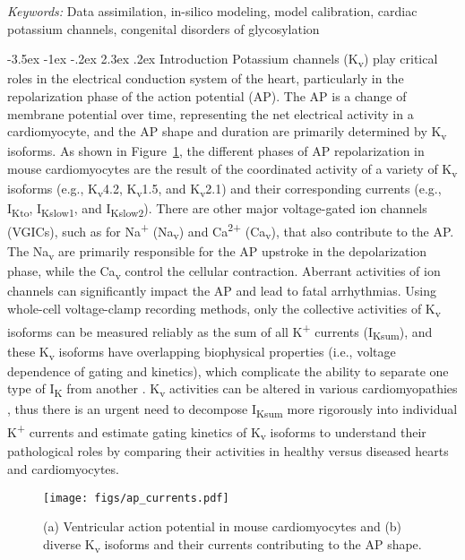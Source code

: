 \documentclass[11pt]{article}
\makeatletter
\renewcommand\section{\@startsection {section}{1}{\z@}%
                                   {-3.5ex \@plus -1ex \@minus -.2ex}%
                                   {2.3ex \@plus.2ex}%
                                   {\normalfont\fontfamily{phv}\fontsize{16}{19}\bfseries}}
\makeatother
\begin{document}
\noindent%
{\it Keywords:} Data assimilation, in-silico modeling, model calibration, cardiac potassium channels, congenital disorders of glycosylation

{} %

\section{Introduction}
Potassium channels (K\textsubscript{v}) play critical roles in the electrical conduction system of the heart, particularly in the repolarization phase of the action potential (AP). The AP is a change of membrane potential over time, representing the net electrical activity in a cardiomyocyte, and the AP shape and duration are primarily determined by K\textsubscript{v} isoforms. As shown in Figure~\ref{fig:ap_currents}, the different phases of AP repolarization in mouse cardiomyocytes are the result of the coordinated activity of a variety of K\textsubscript{v} isoforms (e.g., K\textsubscript{v}4.2, K\textsubscript{v}1.5, and K\textsubscript{v}2.1) and their corresponding currents (e.g., I\textsubscript{Kto}, I\textsubscript{Kslow1}, and I\textsubscript{Kslow2}). There are other major voltage-gated ion channels (VGICs), such as for Na\textsuperscript{+} (Na\textsubscript{v}) and Ca\textsuperscript{2+} (Ca\textsubscript{v}), that also contribute to the AP. The Na\textsubscript{v} are primarily responsible for the AP upstroke in the depolarization phase, while the Ca\textsubscript{v} control the cellular contraction. Aberrant activities of ion channels can significantly impact the AP and lead to fatal arrhythmias. Using whole-cell voltage-clamp recording methods, only the collective activities of K\textsubscript{v} isoforms can be measured reliably as the sum of all K\textsuperscript{+} currents (I\textsubscript{Ksum}), and these K\textsubscript{v} isoforms have overlapping biophysical properties (i.e., voltage dependence of gating and kinetics), which complicate the ability to separate one type of I\textsubscript{K} from another \citep{brouillette2004functional}. K\textsubscript{v} activities can be altered in various cardiomyopathies \citep{tristani2001molecular,giudicessi2012potassium}, thus there is an urgent need to decompose I\textsubscript{Ksum} more rigorously into individual K\textsuperscript{+} currents and estimate gating kinetics of K\textsubscript{v} isoforms to understand their pathological roles by comparing their activities in healthy versus diseased hearts and cardiomyocytes.
\begin{figure}[!ht]
    \centering
    \texttt{[image: figs/ap\_currents.pdf]}
    \caption{(a) Ventricular action potential in mouse cardiomyocytes and (b) diverse K\textsubscript{v} isoforms and their currents contributing to the AP shape.}
    \label{fig:ap_currents}
\end{figure}
\end{document}
